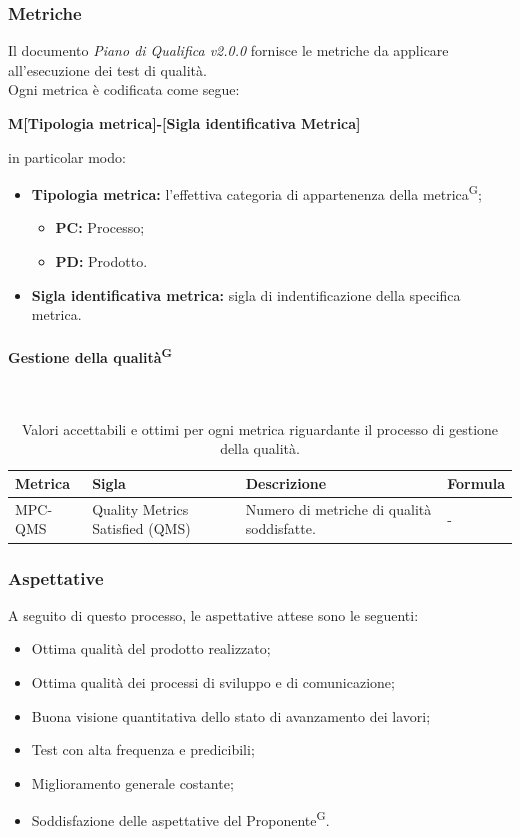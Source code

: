 \documentclass[8pt]{article}
\newcommand{\glossterm}[1]{#1\textsuperscript{G}} %
\newcommand{\subsubsubsection}[1]{\paragraph{#1}\mbox{}\\}
\begin{document}
\subsubsection{Metriche}
Il documento \textit{Piano di Qualifica v2.0.0} fornisce le metriche da applicare all'esecuzione dei test di qualità.
\\Ogni metrica è codificata come segue:
\begin{center}
    \textbf{M[Tipologia metrica]-[Sigla identificativa Metrica]}
\end{center}
in particolar modo:
\begin{itemize}
	\item\textbf{Tipologia metrica:} l'effettiva categoria di appartenenza della
      \glossterm{metrica};
	\begin{itemize}
    \item \textbf{PC:} Processo;
		\item \textbf{PD:} Prodotto.
	\end{itemize}
	\item\textbf{Sigla identificativa metrica:} sigla di indentificazione della specifica metrica.
\end{itemize}
\clearpage
\subsubsubsection{Gestione della \glossterm{qualità}} \label{sec:gestione_qualita}
\begin{table}[H]	
	\centering
	\begin{tabular}{p{2cm} p{3cm} p{6cm} p{4cm}}
		\toprule
		\textbf{Metrica}& \textbf{Sigla} & \textbf{Descrizione} & \textbf{Formula} \\
		\midrule
		MPC-QMS & Quality Metrics Satisfied (QMS) & Numero di metriche di qualità soddisfatte. & - \\
		\bottomrule
	\end{tabular}
	\caption{Valori accettabili e ottimi per ogni metrica riguardante il processo di gestione della qualità.}
	\label{table:Valori accettabili e ottimi per ogni metrica riguardante il processo di gestione della qualità.}
\end{table}

\subsubsection{Aspettative}
A seguito di questo processo, le aspettative attese sono le seguenti:
\begin{itemize}
    \item Ottima qualità del prodotto realizzato;
    \item Ottima qualità dei processi di sviluppo e di comunicazione;
    \item Buona visione quantitativa dello stato di avanzamento dei lavori;
    \item Test con alta frequenza e predicibili;
    \item Miglioramento generale costante;
    \item Soddisfazione delle aspettative del \glossterm{Proponente}.
\end{itemize}
\clearpage
\end{document}
